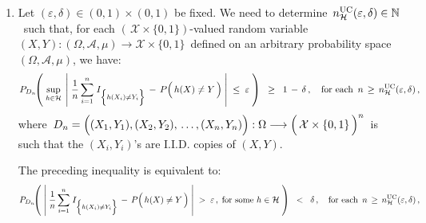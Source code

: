 \begin{enumerate}
\item
	Let $(\varepsilon,\delta) \in (0,1) \times (0,1)$ be fixed.
	We need to determine
	\,$n^{\textnormal{UC}}_{\mathcal{H}}(\varepsilon,\delta) \in \mathbb{N}$\,
	such that, for each $\left(\,\mathcal{X}\times\{0,1\}\right)$-valued random variable
	\,$(X,Y) : (\Omega,\mathcal{A},\mu) \longrightarrow \mathcal{X}\times\{0,1\}$\,
	defined on an arbitrary probability space $(\Omega,\mathcal{A},\mu)$, we have:
	\begin{equation*}
	P_{D_{n}}\!\!\left(\;
		\underset{h\in\mathcal{H}}{\sup}\;
			\left\vert\;
				\dfrac{1}{n}\,\overset{n}{\underset{i=1}{\sum}}\;
				I_{\left\{h(X_{i}) \overset{{\color{white}.}}{\neq} Y_{i}\right\}}
				\, - \, P\!\left(\,h(X) \overset{{\color{white}.}}{\neq} Y\,\right)
				\;\right\vert
		\; \leq \; \varepsilon
		\;\right)
	\;\; \geq \;\; 1 \, - \, \delta\,,
	\quad\textnormal{for each \,$n \,\geq\, n^{\textnormal{UC}}_{\mathcal{H}}(\varepsilon,\delta)$}\,,
	\end{equation*}
	where
	\,$D_{n} = \left((X_{1},Y_{1}),(X_{2},Y_{2}),\,\overset{{\color{white}\vert}}{\ldots}\,,(X_{n},Y_{n})\right)
		: \Omega \longrightarrow
		\left(\,\mathcal{X}\overset{{\color{white}.}}{\times}\{0,1\}\,\right)^{n}$\,
	is such that the $(X_{i},Y_{i})$'s are I.I.D. copies of $(X,Y)$.
	
	\vskip 0.3cm
	\noindent
	The preceding inequality is equivalent to:
	\begin{equation*}
	P_{D_{n}}\!\!\left(\;
		\left\vert\;
			\dfrac{1}{n}\,\overset{n}{\underset{i=1}{\sum}}\;
			I_{\left\{h(X_{i}) \overset{{\color{white}.}}{\neq} Y_{i}\right\}}
			\, - \, P\!\left(\,h(X) \overset{{\color{white}.}}{\neq} Y\,\right)
			\;\right\vert
		\; > \; \varepsilon\,,
		\;\textnormal{for some $h\in\mathcal{H}$}
		\;\right)
	\;\; < \;\; \delta\,,
	\quad\textnormal{for each \,$n \,\geq\, n^{\textnormal{UC}}_{\mathcal{H}}(\varepsilon,\delta)$}\,,
	\end{equation*}


\end{enumerate}
